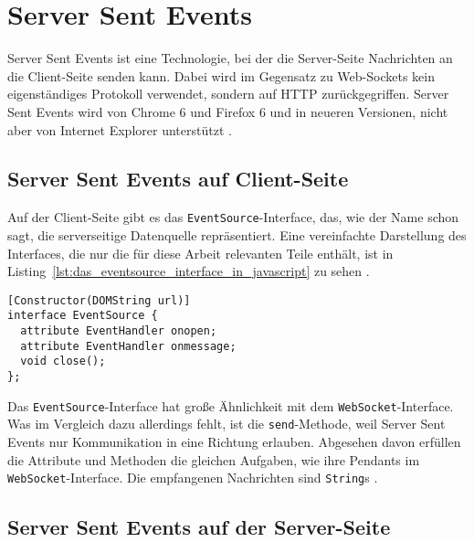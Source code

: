 \section{Server Sent Events} %
\label{sec:server_sent_events}

Server Sent Events ist eine Technologie, bei der die Server-Seite Nachrichten an die Client-Seite senden kann.
Dabei wird im Gegensatz zu Web-Sockets kein eigenständiges Protokoll verwendet, sondern auf HTTP zurückgegriffen.
Server Sent Events wird von Chrome 6 und Firefox 6 und in neueren Versionen, nicht aber von Internet Explorer unterstützt \cite[vgl.][]{js_eventsource_compatibility}.

\subsection{Server Sent Events auf Client-Seite} %
\label{sub:server_sent_events_auf_client_seite}

Auf der Client-Seite gibt es das \lstinline|EventSource|-Interface, das, wie der Name schon sagt, die serverseitige Datenquelle repräsentiert.
Eine vereinfachte Darstellung des Interfaces, die nur die für diese Arbeit relevanten Teile enthält, ist in Listing~\ref{lst:das_eventsource_interface_in_javascript} zu sehen \cite[vgl.][]{js_eventsource}.

\begin{lstlisting}[caption=Das EventSource-Interface in JavaScript, label=lst:das_eventsource_interface_in_javascript]
[Constructor(DOMString url)]
interface EventSource {
  attribute EventHandler onopen;
  attribute EventHandler onmessage;
  void close();
};
\end{lstlisting}

Das \lstinline|EventSource|-Interface hat große Ähnlichkeit mit dem \lstinline|WebSocket|-Interface.
Was im Vergleich dazu allerdings fehlt, ist die \lstinline|send|-Methode, weil Server Sent Events nur Kommunikation in eine Richtung erlauben.
Abgesehen davon erfüllen die Attribute und Methoden die gleichen Aufgaben, wie ihre Pendants im \lstinline|WebSocket|-Interface.
Die empfangenen Nachrichten sind \lstinline|String|s \cite[vgl.][]{js_eventsource}.


\subsection{Server Sent Events auf der Server-Seite} %
\label{sub:server_sent_events_auf_der_server_seite}

